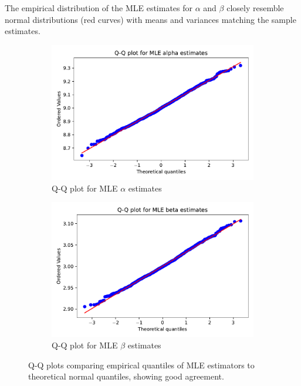 The empirical distribution of the MLE estimates for \(\alpha\) and \(\beta\) closely resemble normal distributions (red curves) with means and variances matching the sample estimates.

\begin{figure}[H]
    \centering
    \begin{subfigure}[b]{0.48\textwidth}
        \centering
        \includegraphics[width=\textwidth]{resources/figures/q11c-alpha_mle_qqplot.pdf}
        \caption{Q-Q plot for MLE \(\alpha\) estimates}
        \label{fig:mle_alpha_qq}
    \end{subfigure}
    \hfill
    \begin{subfigure}[b]{0.48\textwidth}
        \centering
        \includegraphics[width=\textwidth]{resources/figures/q11c-beta_mle_qqplot.pdf}
        \caption{Q-Q plot for MLE \(\beta\) estimates}
        \label{fig:mle_beta_qq}
    \end{subfigure}
    \caption{Q-Q plots comparing empirical quantiles of MLE estimators to theoretical normal quantiles, showing good agreement.}
    \label{fig:mle_qqplots}
\end{figure}

